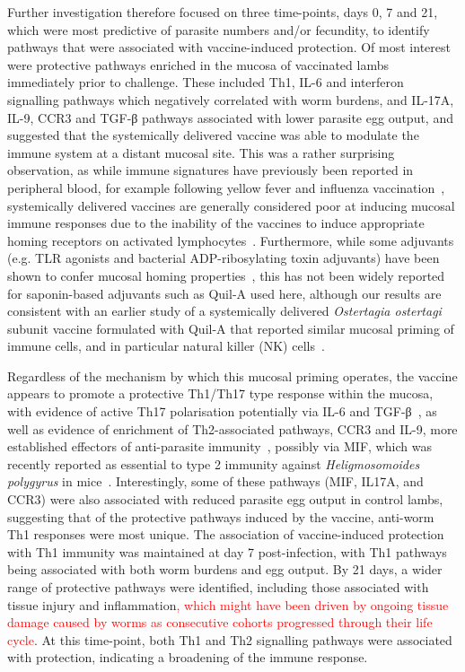\documentclass[a4paper, hidelinks, 11pt]{article}
\begin{document}
Further investigation therefore focused on three time-points, days 0, 7 and 21,
which were most predictive of parasite numbers and/or fecundity, to identify
pathways that were associated with vaccine-induced protection. Of most interest
were protective pathways enriched in the mucosa of vaccinated lambs immediately
prior to challenge. These included Th1, IL-6 and interferon signalling pathways
which negatively correlated with worm burdens, and IL-17A, IL-9, CCR3 and TGF-β
pathways associated with lower parasite egg output, and suggested that the
systemically delivered vaccine was able to modulate the immune system at a
distant mucosal site. This was a rather surprising observation, as while immune
signatures have previously been reported in peripheral blood, for example
following yellow fever and influenza
vaccination~\supercite{Kotliarov2020,Hou2017}, systemically delivered vaccines
are generally considered poor at inducing mucosal immune responses due to the
inability of the vaccines to induce appropriate homing receptors on activated
lymphocytes~\supercite{Clements2016}. Furthermore, while some adjuvants (e.g.
TLR agonists and bacterial ADP-ribosylating toxin adjuvants) have been shown to
confer mucosal homing properties~\supercite{Frederick2018}, this has not been
widely reported for saponin-based adjuvants such as Quil-A used here, although
our results are consistent with an earlier study of a systemically delivered
\emph{Ostertagia ostertagi} subunit vaccine formulated with Quil-A that reported
similar mucosal priming of immune cells, and in particular natural killer (NK)
cells~\supercite{Gonzalez-Hernandez2016}.

Regardless of the mechanism by which this mucosal priming operates, the vaccine
appears to promote a protective Th1/Th17 type response within the mucosa, with
evidence of active Th17 polarisation potentially via IL-6 and
TGF-β~\supercite{Li2007d,Mangan2006,Zhou2007a}, as well as evidence of enrichment of
Th2-associated pathways, CCR3 and IL-9, more established effectors of
anti-parasite immunity~\supercite{Faulkner1997}, possibly via MIF, which was
recently reported as essential to type 2 immunity against \emph{Heligmosomoides
polygyrus} in mice~\supercite{Filbey2019}. Interestingly, some of these pathways
(MIF, IL17A, and CCR3) were also associated with reduced parasite egg output in
control lambs, suggesting that of the protective pathways induced by the
vaccine, anti-worm Th1 responses were most unique. The association of
vaccine-induced protection with Th1 immunity was maintained at day 7
post-infection, with Th1 pathways being associated with both worm burdens and
egg output. By 21 days, a wider range of protective pathways were identified,
including those associated with tissue injury and inflammation\textcolor{red}{, which might have been driven by ongoing tissue damage caused by worms as consecutive cohorts progressed through their life cycle}. At this
time-point, both Th1 and Th2 signalling pathways were associated with
protection, indicating a broadening of the immune response.
\end{document}
